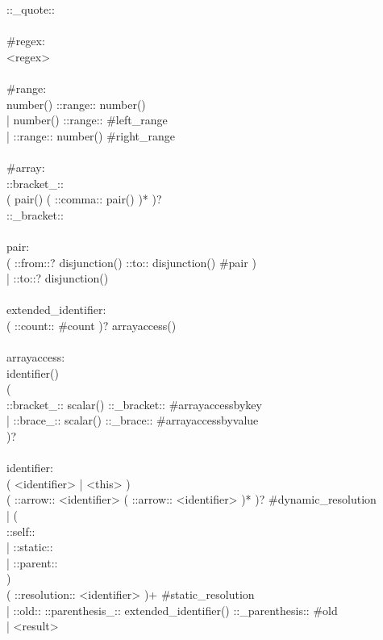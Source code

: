 \begin{bigbigpre}
    ::_quote:: \\
 \\
#regex: \\
    <regex> \\
 \\
#range: \\
    number() ::range:: number() \\
  | number() ::range:: #left_range \\
  | ::range:: number() #right_range \\
 \\
#array: \\
    ::bracket_:: \\
    ( pair() ( ::comma:: pair() )* )? \\
    ::_bracket:: \\
 \\
pair: \\
    ( ::from::? disjunction() ::to:: disjunction() #pair ) \\
  | ::to::? disjunction() \\
 \\
extended_identifier: \\
    ( ::count:: #count )? arrayaccess() \\
 \\
arrayaccess: \\
    identifier() \\
    ( \\
        ::bracket_:: scalar() ::_bracket:: #arrayaccessbykey \\
      | ::brace_::   scalar() ::_brace::   #arrayaccessbyvalue \\
    )? \\
 \\
identifier: \\
    ( <identifier> | <this> ) \\
    ( ::arrow:: <identifier> ( ::arrow:: <identifier> )* )? #dynamic_resolution \\
  | ( \\
        ::self:: \\
      | ::static:: \\
      | ::parent:: \\
    ) \\
    ( ::resolution:: <identifier> )+ #static_resolution \\
  | ::old:: ::parenthesis_:: extended_identifier() ::_parenthesis:: #old \\
  | <result> \\

\end{bigbigpre}
